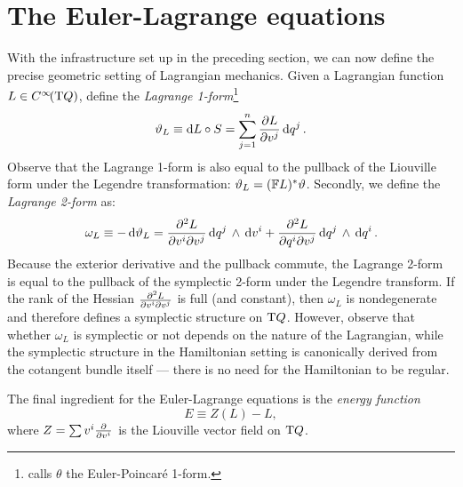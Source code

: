 \section{The Euler-Lagrange equations} With the infrastructure set up in the preceding section, we can now define the precise geometric setting of Lagrangian mechanics. Given a Lagrangian function \(L \in C^\infty\!\qty(\mathrm{T}Q)\), define the \emph{Lagrange 1-form}\footnote
{\citet{Carinena1990} calls \(\theta\) the Euler-Poincaré 1-form.}
\begin{equation}
    \vartheta_L \equiv \dd{L} \circ S = \sum_{j=1}^n \pdv{L}{v^j}\dd{q^j}.
\end{equation}
Observe that the Lagrange 1-form is also equal to the pullback of the Liouville form under the Legendre transformation: \(\vartheta_L = (\mathbb{F}L)^* \vartheta\). \cite{Abraham1978}
Secondly, we define the \emph{Lagrange 2-form} as: \cite{Abraham1978,Carinena1990}
\begin{equation}
    \omega_L \equiv - \dd{\vartheta}_L = \pdv[2]{L}{v^i}{v^j} \dd{q^j}\,\wedge\,\dd{v^i}  + \pdv[2]{L}{q^i}{v^j} \dd{q^j}\,\wedge\,\dd{q^i} .
\end{equation}
Because the exterior derivative and the pullback commute, the Lagrange 2-form is equal to the pullback of the symplectic 2-form under the Legendre transform. If the rank of the Hessian \( \pdv[2]{L}{v^i}{v^j}\) is full (and constant), then \(\omega_L\) is nondegenerate and therefore defines a symplectic structure on \(\mathrm{T}Q\). However, observe that whether \(\omega_L\) is symplectic or not depends on the nature of the Lagrangian, while the symplectic structure in the Hamiltonian setting is canonically derived from the cotangent bundle itself --- there is no need for the Hamiltonian to be regular.

The final ingredient for the Euler-Lagrange equations is the \emph{energy function}
\begin{equation}
     E \equiv Z(L) - L,
\end{equation}
where \(Z = \sum v^i \pdv{}{v^i}\) is the Liouville vector field on \(\mathrm{T}Q\).

